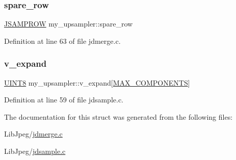 \subsubsection{\texorpdfstring{spare\_row}{spare\_row}}
{\footnotesize\ttfamily \mbox{\hyperlink{jpeglib_8h_ace11642f14c454c9ddbe2741132f4e68}{J\+S\+A\+M\+P\+R\+OW}} my\+\_\+upsampler\+::spare\+\_\+row}



Definition at line 63 of file jdmerge.\+c.

\mbox{\label{structmy__upsampler_a48df5e8df66ba2f1275f54a617eaf888}} 
\subsubsection{\texorpdfstring{v\_expand}{v\_expand}}
{\footnotesize\ttfamily \mbox{\hyperlink{jmorecfg_8h_adfb9a8ea1dd59f151065f763e1e9acd6}{U\+I\+N\+T8}} my\+\_\+upsampler\+::v\+\_\+expand\mbox{[}\mbox{\hyperlink{jmorecfg_8h_a6d8c910a1fdb6d4762a05f7250e64322}{M\+A\+X\+\_\+\+C\+O\+M\+P\+O\+N\+E\+N\+TS}}\mbox{]}}



Definition at line 59 of file jdsample.\+c.



The documentation for this struct was generated from the following files\+:\begin{DoxyCompactItemize}
\item 
Lib\+Jpeg/\mbox{\hyperlink{jdmerge_8c}{jdmerge.\+c}}\item 
Lib\+Jpeg/\mbox{\hyperlink{jdsample_8c}{jdsample.\+c}}\end{DoxyCompactItemize}
